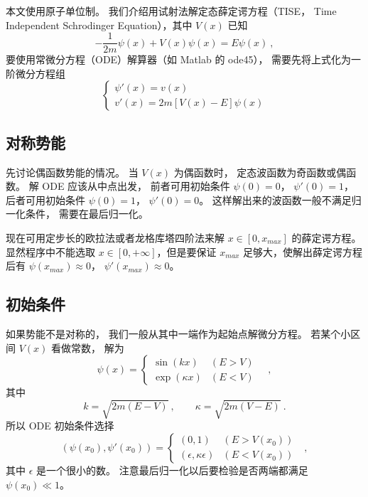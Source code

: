 


本文使用原子单位制。 我们介绍用试射法解定态薛定谔方程（TISE， Time Independent Schrodinger Equation），其中 $V(x)$ 已知
\begin{equation}
-\frac{1}{2m}\psi(x) + V(x)\psi(x) = E \psi(x)~,
\end{equation}
要使用常微分方程（ODE）解算器（如 Matlab 的 ode45）， 需要先将上式化为一阶微分方程组
\begin{equation}
\begin{cases}
\psi'(x) = v(x)\\
v'(x) = 2m[V(x) - E]\psi(x)
\end{cases}
\end{equation}

\subsection{对称势能}
先讨论偶函数势能的情况。 当 $V(x)$ 为偶函数时， 定态波函数为奇函数或偶函数。 解 ODE 应该从中点出发， 前者可用初始条件 $\psi(0)=0$， $\psi'(0)=1$， 后者可用初始条件 $\psi(0)=1$， $\psi'(0)=0$。 这样解出来的波函数一般不满足归一化条件， 需要在最后归一化。

现在可用定步长的欧拉法或者龙格库塔四阶法来解 $x\in [0, x_{max}]$ 的薛定谔方程。 显然程序中不能选取 $x\in [0,+\infty]$，但是要保证 $x_{max}$ 足够大，使解出薛定谔方程后有 $\psi(x_{max})\approx 0$， $\psi'(x_{max})\approx 0$。

\subsection{初始条件}
如果势能不是对称的， 我们一般从其中一端作为起始点解微分方程。 若某个小区间 $V(x)$ 看做常数， 解为
\begin{equation}
\psi(x) =
\begin{cases}
\sin(kx) &(E > V)\\
\exp(\kappa x) & (E < V)
\end{cases}\quad,
\end{equation}
其中
\begin{equation}
k = \sqrt{2m(E - V)}~, \qquad
\kappa = \sqrt{2m(V - E)}~.
\end{equation}
所以 ODE  初始条件选择
\begin{equation}
(\psi(x_0), \psi'(x_0)) =
\begin{cases}
(0, 1) &(E > V(x_0))\\
(\epsilon, \kappa\epsilon) & (E < V(x_0))
\end{cases}~~~,
\end{equation}
其中 $\epsilon$ 是一个很小的数。 注意最后归一化以后要检验是否两端都满足 $\psi(x_0) \ll 1$。

